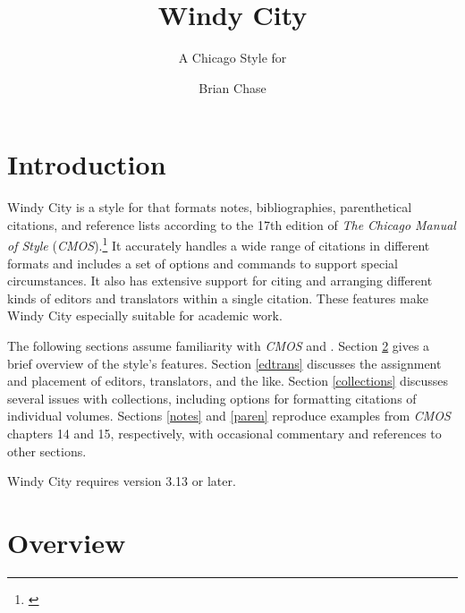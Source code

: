\documentclass[11pt,letterpaper,oneside]{article}
\begin{document}
\title{Windy City}
\subtitle{A Chicago Style for \texttt{\biblatex}}
\author{Brian Chase}
\maketitle
\begingroup
\hypersetup{linkcolor=black}
\tableofcontents{}
\endgroup

\section{Introduction}


Windy City is a style for \biblatex that formats notes,
bibliographies, parenthetical citations, and reference lists according
to the 17th edition of \textit{The Chicago Manual of Style}
(\textit{CMOS}).\footnote{\cite{chicago2017}} It accurately handles a
wide range of citations in different formats and includes a set of
options and commands to support special circumstances. It also has
extensive support for citing and arranging different kinds of editors
and translators within a single citation. These features make Windy
City especially suitable for academic work.

The following sections assume familiarity with \textit{CMOS} and
\biblatex. Section \ref{overview} gives a brief overview of the
style's features. Section \ref{edtrans} discusses the assignment and
placement of editors, translators, and the like. Section
\ref{collections} discusses several issues with collections, including
options for formatting citations of individual volumes. Sections
\ref{notes} and \ref{paren} reproduce examples from \textit{CMOS}
chapters 14 and 15, respectively, with occasional commentary and
references to other sections.

Windy City requires \biblatex version 3.13 or later.

\section{Overview}
\label{overview}
\end{document}
